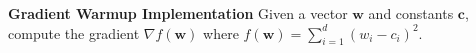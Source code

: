 \item {} \textbf{Gradient Warmup Implementation}
Given a vector $\mathbf w$ and constants $\mathbf c$, compute the gradient $\nabla f(\mathbf w)$ where $f(\mathbf w)=\sum_{i=1}^d (w_i-c_i)^2$.

